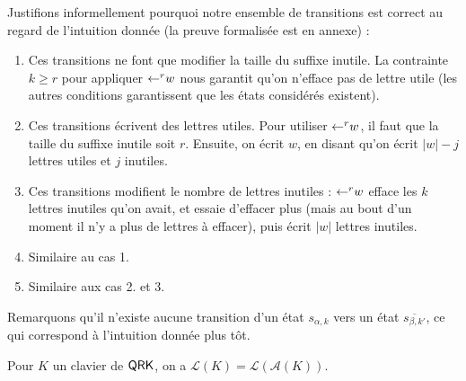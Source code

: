 \documentclass[12pt, a4paper]{article}
\renewcommand{\L}{\mathcal{L}}
\renewcommand{\bar}{\overline}
\newcommand{\A}{\mathcal{A}}
\begin{document}
    
    Justifions informellement pourquoi notre ensemble de transitions est correct au regard de l'intuition donnée (la preuve formalisée est en annexe) :
    \begin{enumerate}
        \item Ces transitions ne font que modifier la taille du suffixe inutile. La contrainte $k \geqslant r$ pour appliquer $\mathord{\leftarrow}^r w$ nous garantit qu'on n'efface pas de lettre utile (les autres conditions garantissent que les états considérés existent).
        \item Ces transitions écrivent des lettres utiles. Pour utiliser $\mathord{\leftarrow}^r w$, il faut que la taille du suffixe inutile soit $r$. Ensuite, on écrit $w$, en disant qu'on écrit $|w|-j$ lettres utiles et $j$ inutiles.
        \item Ces transitions modifient le nombre de lettres inutiles : $\mathord{\leftarrow}^r w$ efface les $k$ lettres inutiles qu'on avait, et essaie d'effacer plus (mais au bout d'un moment il n'y a plus de lettres à effacer), puis écrit $|w|$ lettres inutiles.
        \item Similaire au cas 1.
        \item Similaire aux cas 2. et 3.
    \end{enumerate}
    Remarquons qu'il n'existe aucune transition d'un état $s_{\alpha, k}$ vers un état $\bar{s_{\beta, k'}}$, ce qui correspond à l'intuition donnée plus tôt.
    
    \begin{bisimautomclav}\label{lklak}
        Pour $K$ un clavier de $\mathsf{QRK}$, on a $\L(K) = \L(\A(K))$.
    \end{bisimautomclav}
\end{document}
